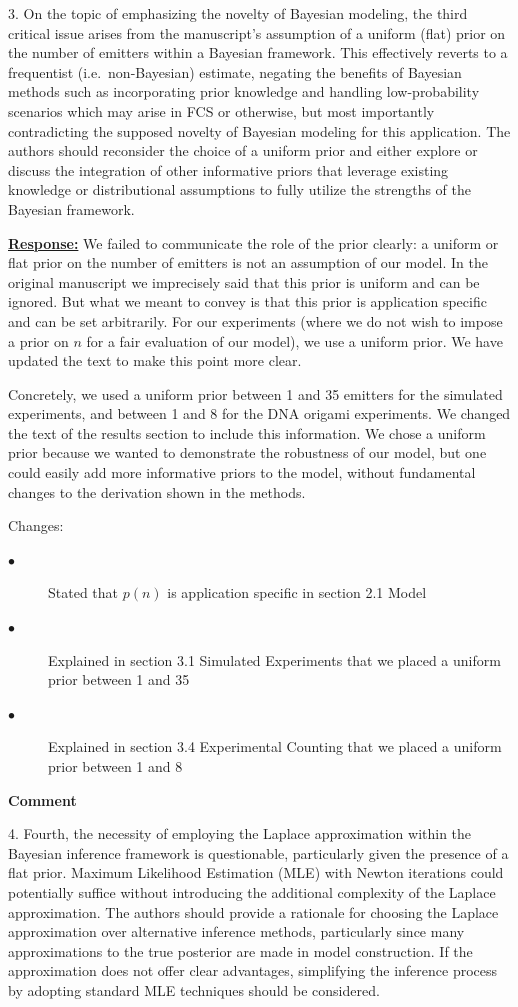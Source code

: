 \documentclass{article}
\begin{document}
3.	On the topic of emphasizing the novelty of Bayesian modeling, 
the third critical issue arises from the manuscript's assumption of a uniform (flat) 
prior on the number of emitters within a Bayesian framework. 
This effectively reverts to a frequentist (i.e.\ non-Bayesian) estimate, 
negating the benefits of Bayesian methods such as incorporating prior knowledge 
and handling low-probability scenarios which may arise in FCS or otherwise, 
but most importantly contradicting the supposed novelty of Bayesian modeling for this application. 
The authors should reconsider the choice of a uniform prior and either explore or discuss 
the integration of other informative priors that leverage existing knowledge or distributional 
assumptions to fully utilize the strengths of the Bayesian framework.

\underline{\textbf{Response:}}
We failed to communicate the role of the prior clearly: a uniform or flat prior on the number of emitters is 
not an assumption of our model. In the original manuscript we imprecisely said that this prior is uniform and 
can be ignored. But what we meant to convey is that this prior is application specific and can be set arbitrarily. For our experiments (where we do not wish to impose a prior on $n$ for a fair evaluation of our model), we use a uniform prior. We have updated the text to make 
this point more clear. 

Concretely, we used a uniform prior between 1 and 35 emitters for the simulated experiments, and between 1 and 8 for the DNA origami experiments.
We changed the text of the results section to include this information.
We chose a uniform prior because we wanted to demonstrate the robustness of our model, but one could easily 
add more informative priors to the model, without fundamental changes to the derivation shown in the methods. 

Changes:
\begin{description}
    \item[$\bullet$] Stated that $p(n)$ is application specific in section 2.1 Model
    \item[$\bullet$] Explained in section 3.1 Simulated Experiments that we placed a uniform prior between 1 and 35
    \item[$\bullet$] Explained in section 3.4 Experimental Counting that we placed a uniform prior between 1 and 8
\end{description}

\textbf{Comment}

 4.	Fourth, the necessity of employing the Laplace approximation within the 
 Bayesian inference framework is questionable, particularly given the presence of a flat prior. 
 Maximum Likelihood Estimation (MLE) with Newton iterations could potentially suffice without 
 introducing the additional complexity of the Laplace approximation. 
 The authors should provide a rationale for choosing the Laplace approximation over 
 alternative inference methods, particularly since many approximations to the true 
 posterior are made in model construction. If the approximation does not offer clear advantages, 
 simplifying the inference process by adopting standard MLE techniques should be considered.
\end{document}
